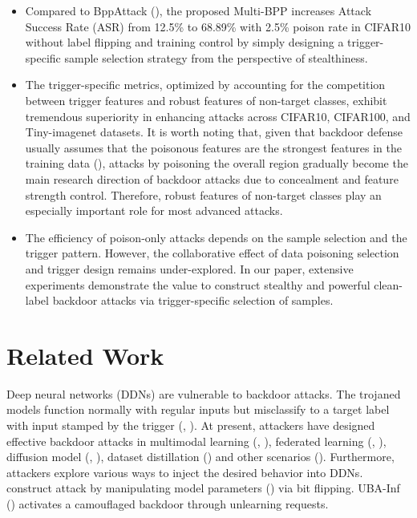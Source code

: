 \documentclass{article}
\begin{document}
\begin{itemize}
\item Compared to BppAttack (\citet{wang2022bppattack}), the proposed Multi-BPP increases Attack Success Rate (ASR) from 12.5\% to 68.89\% with 2.5\% poison rate in CIFAR10 without label flipping and training control by simply designing a trigger-specific sample selection strategy from the perspective of stealthiness. 
\item The trigger-specific metrics, optimized by accounting for the competition between trigger features and robust features of non-target classes, exhibit tremendous superiority in enhancing attacks across CIFAR10, CIFAR100, and Tiny-imagenet datasets. It is worth noting that, given that backdoor defense usually assumes that the poisonous features are the strongest features in the training data (\citet{khaddaj2023rethinking}), attacks by poisoning the overall region gradually become the main research direction of backdoor attacks due to concealment and feature strength control. Therefore, robust features of non-target classes play an especially important role for most advanced attacks.
\item The efficiency of poison-only attacks depends on the sample selection and the trigger pattern. However, the collaborative effect of data poisoning selection and trigger design remains under-explored. In our paper, extensive experiments demonstrate the value to construct stealthy and powerful clean-label backdoor attacks via trigger-specific selection of samples.
\end{itemize}

\section{Related Work}
Deep neural networks (DDNs) are vulnerable to backdoor attacks. The trojaned models function normally with regular inputs but misclassify to a target label with input stamped by the trigger (\citet{gu2017badnets}, \citet{chen2017targeted}). At present, attackers have designed effective backdoor attacks in multimodal learning (\citet{wang2024invisible}, \citet{han2024backdooring}), federated learning (\citet{li20233dfed}, \citet{chen2023practical}), diffusion model (\citet{chou2023villandiffusion}, \citet{li2024invisible}), dataset distillation (\citet{liu2023backdoor}) and other scenarios (\citet{zhao2024exploring}). Furthermore, attackers explore various ways to inject the desired behavior into DDNs. \citet{bai2022hardly} construct attack by manipulating model parameters (\citet{qi2022towards}) via bit flipping. UBA-Inf (\citet{huang2024uba}) activates a camouflaged backdoor through unlearning requests.
\end{document}
